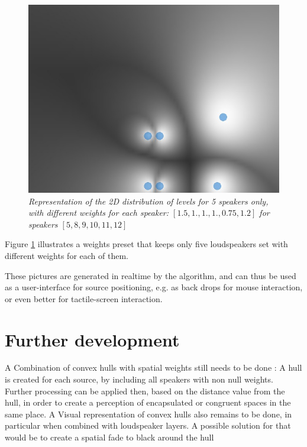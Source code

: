 \documentclass[twoside,10pt]{article}
\begin{document}
\begin{figure}[ht]
\centerline{\includegraphics[scale=0.5]{spk_groups}}
\caption{{\it Representation of the 2D distribution of levels for 5 speakers only, with different weights for each speaker: $[1.5,1.,1.,1.,0.75,1.2]$ for speakers $[5,8,9,10,11,12]$}}  
\label{fig:5spk_weights}
\end{figure}

Figure \ref{fig:5spk_weights} illustrates a weights preset that keeps only five loudspeakers set with different weights for each of them.

These pictures are generated in realtime by the algorithm, and can thus be used as a user-interface for source positioning, e.g. as back drops for mouse interaction, or even better for tactile-screen interaction.



\section{Further development}

A Combination of convex hulls with spatial weights still needs to be done : A hull is created for each source, by including all speakers with non null weights. Further processing can be applied then, based on the distance value from the hull, in order to create a perception of encapsulated or congruent spaces in the same place.
A Visual representation of convex hulls also remains to be done, in particular when combined with loudspeaker layers. A possible solution for that would be to create a spatial fade to black around the hull 
\end{document}
